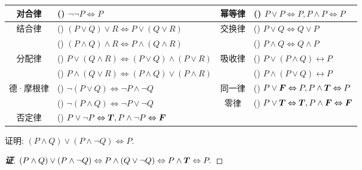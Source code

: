\setcounter{magicrownumbers}{0}
\begin{table}[H]
    \centering
    \begin{tabular}{c l | c l}
        对合律                     & (\rownumber{}) $\neg\neg P\Leftrightarrow P$                                               & 幂等律                  & (\rownumber{}) $P\vee P\Leftrightarrow P,P\wedge P\Leftrightarrow P$                         \\
        \midrule
        \multirow{2}{*}{结合律}    & (\rownumber{}) $(P\vee Q)\vee R\Leftrightarrow P\vee (Q\vee R)$                            & \multirow{2}{*}{交换律} & (\rownumber{}) $P\vee Q\Leftrightarrow Q\vee P$                                              \\
                                   & (\rownumber{}) $(P\wedge Q)\wedge R\Leftrightarrow P\wedge (Q\wedge R)$                    &                         & (\rownumber{}) $P\wedge Q\Leftrightarrow Q\wedge P$                                          \\
        \midrule
        \multirow{2}{*}{分配律}    & (\rownumber{}) $P\vee (Q\wedge R)\Leftrightarrow (P\vee Q)\wedge(P\vee R)$                 & \multirow{2}{*}{吸收律} & (\rownumber{}) $P\vee(P\wedge Q)\leftrightarrow P$                                           \\
                                   & (\rownumber{}) $P\wedge (Q\vee R)\Leftrightarrow (P\wedge Q)\vee(P\wedge R)$               &                         & (\rownumber{}) $P\wedge(P\vee Q)\leftrightarrow P$                                           \\
        \midrule
        \multirow{2}{*}{德·摩根律} & (\rownumber{}) $\neg(P\vee Q)\Leftrightarrow \neg P\wedge \neg Q$                          & 同一律                  & (\rownumber{}) $P\vee \vb*{F}\Leftrightarrow P,P\wedge \vb*{T}\Leftrightarrow P$             \\
                                   & (\rownumber{}) $\neg(P\wedge Q)\Leftrightarrow \neg P\vee \neg Q$                          & 零律                    & (\rownumber{}) $P\vee \vb*{T}\Leftrightarrow \vb*{T},P\wedge \vb*{F}\Leftrightarrow \vb*{F}$ \\
        \midrule
        否定律                     & (\rownumber{}) $P\vee \neg P\Leftrightarrow \vb*{T},P\wedge \neg P\Leftrightarrow \vb*{F}$
    \end{tabular}
\end{table}

\begin{example}
    证明: $(P\wedge Q)\vee (P\wedge \neg Q)\Leftrightarrow P.$
\end{example}
\begin{proof}[{\songti \textbf{证}}]
    $(P\wedge Q)\vee (P\wedge \neg Q)\Leftrightarrow P\wedge(Q\vee\neg Q)\Leftrightarrow P\wedge \vb*{T}\Leftrightarrow P.$
\end{proof}

